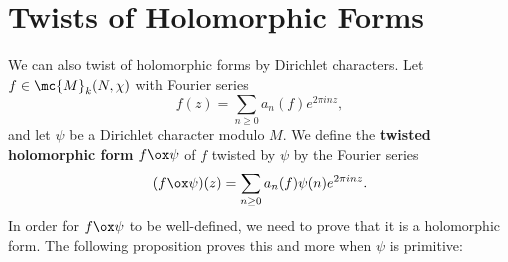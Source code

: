   \section{Twists of Holomorphic Forms}
    We can also twist of holomorphic forms by Dirichlet characters. Let $f \in \mc{M}_{k}(N,\chi)$ with Fourier series
    \[
      f(z) = \sum_{n \ge 0}a_{n}(f)e^{2\pi inz},
    \]
    and let $\psi$ be a Dirichlet character modulo $M$. We define the \textbf{twisted holomorphic form} $f \ox \psi$ of $f$ twisted by $\psi$ by the Fourier series
    \[
      (f \ox \psi)(z) = \sum_{n \ge 0}a_{n}(f)\psi(n)e^{2\pi inz}.
    \]
    In order for $f \ox \psi$ to be well-defined, we need to prove that it is a holomorphic form. The following proposition proves this and more when $\psi$ is primitive:

